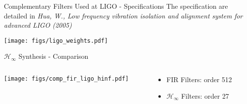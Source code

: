 \documentclass[t]{clean-beamer}
\begin{document}
\begin{frame}[label={sec:org2f1e4c4}]{Complementary Filters Used at LIGO - Specifications}
The specification are detailed in \emph{Hua, W., Low frequency vibration isolation and alignment system for advanced LIGO (2005)}

\begin{center}
\texttt{[image: figs/ligo\_weights.pdf]}
\end{center}

\vspace{0.5em}
\end{frame}

\begin{frame}[label={sec:orgf57371a}]{\(\mathcal{H}_\infty\) Synthesis - Comparison}
\vspace{-1em}
\begin{columns}
\begin{column}{0.6\columnwidth}
\vspace{-2em}
\begin{center}
\texttt{[image: figs/comp\_fir\_ligo\_hinf.pdf]}
\end{center}
\end{column}

\begin{column}{0.4\columnwidth}
\begin{itemize}
\item FIR Filters: order 512
\item \(\mathcal{H}_\infty\) Filters: order 27
\end{itemize}
\end{column}
\end{columns}

\vspace{0.5em}
\end{frame}
\end{document}
